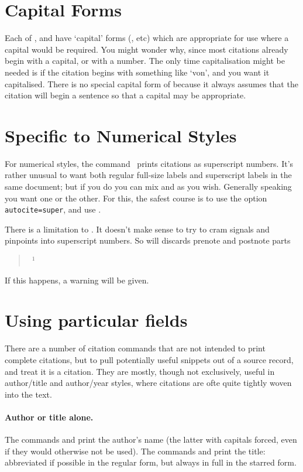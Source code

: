 \section{Capital Forms}

Each of ,  and  have `capital'
forms (, etc) which are appropriate for use where a capital
would be required. You might wonder why, since most citations
already begin with a capital, or with a number. The only time
capitalisation might be needed is if the citation begins with
something like `von', and you want it capitalised. There is no special
capital form of  because it always assumes that the
citation will begin a sentence so that a capital may be appropriate.

\section{Specific to Numerical Styles}

For numerical styles, the command \ prints citations as
superscript numbers. It’s rather unusual to want both regular
full-size labels and superscript labels in the same document; but if
you do you can mix  and  as you wish. Generally
speaking you want one or the other. For this, the safest course is to
use the option \texttt{autocite=super}, and use .

There is a limitation to . It doesn't make sense to try to
cram signals and pinpoints into superscript numbers. So 
will discards prenote and postnote parts
\begin{quote}
 \gives\ $^1$
\end{quote}
If this happens, a warning will be given.

\section{Using particular fields}

There are a number of citation commands that are not intended to print
complete citations, but to pull potentially useful snippets out of a
source record, and treat it is a citation. They are mostly, though not
exclusively, useful in author/title and author/year styles, where
citations are ofte quite tightly woven into the text.

\paragraph{Author or title alone.} The commands  and
 print the author's name (the latter with capitals
forced, even if they would otherwise not be used). The commands
 and  print the title: abbreviated if
possible in the regular form, but always in full in the starred form.

